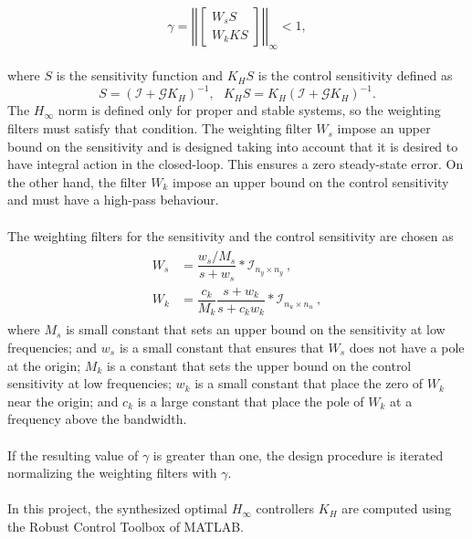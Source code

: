 	\begin{equation}\label{eqn:hinf}
	\gamma = \left|\left|\begin{bmatrix}
	W_{s}S\\W_{k}KS
	\end{bmatrix}\right|\right|_{\infty} < 1,
	\end{equation}
\\where $S$ is the sensitivity function and $K_{H}S$ is the control sensitivity defined as
	\begin{equation}
	S = (\mathcal{I} + \mathcal{G}K_{H})^{-1},\ \ \ K_{H}S = K_{H}(\mathcal{I} + \mathcal{G}K_{H})^{-1}.
	\end{equation}
The $H_\infty$ norm is defined only for proper and stable systems, so the weighting filters must satisfy that condition. The weighting filter $W_{s}$ impose an upper bound on the sensitivity and is designed taking into account that it is desired to have integral action in the closed-loop. This ensures a zero steady-state error. On the other hand, the filter $W_k$ impose an upper bound on the control sensitivity and must have a high-pass behaviour.
\\\\
The weighting filters for the sensitivity and the control sensitivity are chosen as
\begin{align}\label{eqn:wswk}
\begin{split}
W_{s} &= \dfrac{w_{s}/M_{s}}{s + w_{s}}*\mathcal{I}_{n_{y}\times n_{y}}\ ,\\
W_{k} &= \dfrac{c_k}{M_{k}}\dfrac{s+w_{k}}{s+c_{k}w_{k}}*\mathcal{I}_{n_{u}\times n_{u}}\ ,
\end{split}
\end{align}
where $M_s$ is small constant that sets an upper bound on the sensitivity at low frequencies; and $w_s$ is a small constant that ensures that $W_s$ does not have a pole at the origin; $M_k$ is a constant that sets the upper bound on the control sensitivity at low frequencies; $w_k$ is a small constant that place the zero of $W_k$ near the origin; and $c_k$ is a large constant that place the pole of $W_k$ at a frequency above the bandwidth.
\\\\
If the resulting value of $\gamma$ is greater than one, the design procedure is iterated normalizing the weighting filters with $\gamma$.
\\\\
In this project, the synthesized optimal $H_\infty$ controllers $K_H$ are computed using the Robust Control Toolbox of MATLAB.

